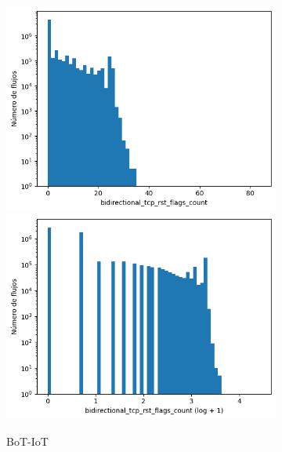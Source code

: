 \begin{figure}[H]
\begin{subfigure}[b]{0.32\textwidth}
        \includegraphics[width=\linewidth]{media/packet_pincer_botiot/bidirectional_tcp_rst_flags_count_linear_x_log_y.png}
        \includegraphics[width=\linewidth]{media/packet_pincer_botiot/bidirectional_tcp_rst_flags_count_log_x_log_y.png}
        \caption{BoT-IoT}
    \end{subfigure}
    \hfill
    \begin{subfigure}[b]{0.32\textwidth}
        \centering

\end{subfigure}
\end{figure}
